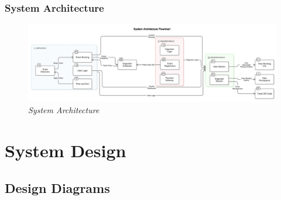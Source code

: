 \documentclass[twoside,a4paper,openright]{report} %
\begin{document}
\subsection{System Architecture}

\begin{figure}[ht]
	\centering
	\includegraphics[scale=0.38]{system.JPG}
	\caption{\textit{System Architecture}}
	\label{fig:SystemArchitecture}
\end{figure}











\chapter{System Design}
\section { Design Diagrams }
\end{document}
